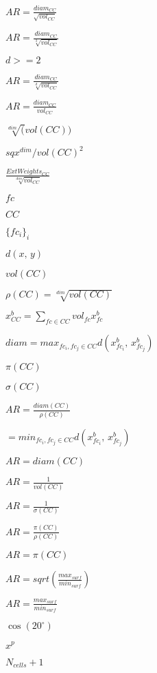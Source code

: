 \documentclass{article}
\begin{document}
$ AR = \frac{diam_{CC}}{\sqrt{vol_{CC}}} $
\pagebreak

$ AR = \frac{diam_{CC}}{\sqrt[3]{vol_{CC}}} $
\pagebreak

$ d >=2 $
\pagebreak

$ AR = \frac{diam_{CC}}{\sqrt[d]{vol_{CC}}} $
\pagebreak

$ AR = \frac{diam_{CC}}{vol_{CC}} $
\pagebreak

$ \sqrt[dim](vol(CC)) $
\pagebreak

$ sqx^{dim} / vol(CC)^2 $
\pagebreak

$ \frac{ExtWeights_{CC}}{\sqrt[dim]{vol_{CC}}} $
\pagebreak

$ fc $
\pagebreak

$ CC $
\pagebreak

$ \{fc_i\}_i $
\pagebreak

$ d(x,\, y) $
\pagebreak

$ vol(CC) $
\pagebreak

$ \rho(CC) = \sqrt[dim]{vol(CC)} $
\pagebreak

$ x^b_{CC} = \sum_{fc \in CC} vol_{fc} x^b_{fc} $
\pagebreak

$ diam = max_{fc_i, fc_j \in CC} d(x^b_{fc_i},\, x^b_{fc_j}) $
\pagebreak

$ \pi(CC) $
\pagebreak

$ \sigma(CC) $
\pagebreak

$ AR = \frac{diam(CC)}{\rho(CC)} $
\pagebreak

$ =min_{fc_i, fc_j \in CC}
 d(x^b_{fc_i},\, x^b_{fc_j}) $
\pagebreak

$ AR = diam(CC) $
\pagebreak

$ AR = \frac{1}{vol(CC)} $
\pagebreak

$ AR = \frac{1}{\sigma(CC)} $
\pagebreak

$ AR = \frac{\pi(CC)}{\rho(CC)} $
\pagebreak

$ AR = \pi(CC) $
\pagebreak

$ AR = sqrt(\frac{max_{surf}}{min_{surf}}) $
\pagebreak

$ AR = \frac{max_{surf}}{min_{surf}} $
\pagebreak

$ \cos(20^\circ) $
\pagebreak

$ x^p $
\pagebreak

$ N_{cells} + 1 $
\pagebreak
\end{document}
